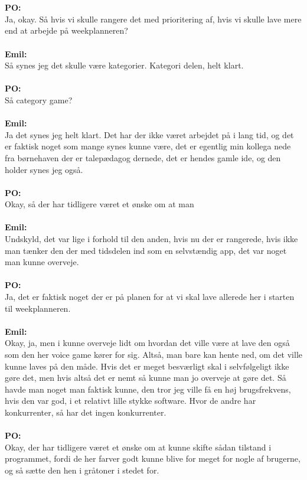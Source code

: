 \\\\
\textbf{PO:}\\
Ja, okay.
Så hvis vi skulle rangere det med prioritering af, hvis vi skulle lave mere end at arbejde på weekplanneren?
\\\\
\textbf{Emil:}\\
Så synes jeg det skulle være kategorier.
Kategori delen, helt klart.
\\\\
\textbf{PO:}\\
Så category game?
\\\\
\textbf{Emil:}\\
Ja det synes jeg helt klart.
Det har der ikke været arbejdet på i lang tid, og det er faktisk noget som mange synes kunne være, det er egentlig min kollega nede fra børnehaven der er talepædagog dernede, det er hendes gamle ide, og den holder synes jeg også.
\\\\
\textbf{PO:}\\
Okay, så der har tidligere været et ønske om at man
\\\\
\textbf{Emil:}\\
Undskyld, det var lige i forhold til den anden, hvis nu der er rangerede, hvis ikke man tænker den der med tidsdelen ind som en selvstændig app, det var noget man kunne overveje.
\\\\
\textbf{PO:}\\
Ja, det er faktisk noget der er på planen for at vi skal lave allerede her i starten til weekplanneren.
\\\\
\textbf{Emil:}\\
Okay, ja, men i kunne overveje lidt om hvordan det ville være at lave den også som den her voice game kører for sig.
Altså, man bare kan hente ned, om det ville kunne laves på den måde.
Hvis det er meget besværligt skal i selvfølgeligt ikke gøre det, men hvis altså det er nemt så kunne man jo overveje at gøre det.
Så havde man noget man faktisk kunne, den tror jeg ville få en høj brugsfrekvens, hvis den var god, i et relativt lille stykke software.
Hvor de andre har konkurrenter, så har det ingen konkurrenter.
\\\\
\textbf{PO:}\\
Okay, der har tidligere været et ønske om at kunne skifte sådan tilstand i programmet, fordi de her farver godt kunne blive for meget for nogle af brugerne, og så sætte den hen i gråtoner i stedet for.
